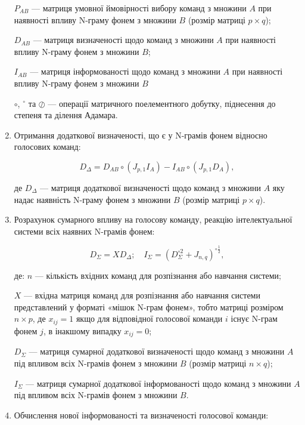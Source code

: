 \begin{enumerate}
{		$P_{AB}$ --- матриця умовної ймовірності вибору команд з множини $A$ при наявності впливу N-граму фонем з множини $B$ (розмір матриці $p\times q$); 
		
		$D_{AB}$ --- матриця визначеності щодо команд з множини $A$ при наявності впливу N-граму фонем з множини $B$; 
		
		$I_{AB}$ --- матриця інформованості щодо команд з множини $A$ при наявності впливу N-граму фонем з множини $B$
		
		$\circ$, ${}^{\circ}$ та $\oslash$ --- операції матричного поелементного добутку, піднесення до степеня та ділення Адамара.
		
	}
	
	\item Отримання додаткової визначеності, що є у N-грамів фонем відносно голосових команд:
	
	\[
	D_\Delta=D_{AB} \circ (J_{p,1}I_A)-I_{AB} \circ (J_{p,1}D_A),
	\]
	
	де $D_\Delta$ --- матриця додаткової визначеності щодо команд з множини $A$ яку надає наявність N-граму фонем з множини $B$ (розмір матриці $p\times q$).
	
	\item Розрахунок сумарного впливу на голосову команду, реакцію інтелектуальної системи всіх наявних N-грамів фонем:
	
	\[
	D_\Sigma = XD_\Delta;\quad I_\Sigma=(D_\Sigma^{\circ 2}+J_{n,q})^{\circ \frac{1}{2}},
	\]
	
	де: $n$ --- кількість вхідних команд для розпізнання або навчання системи; 
	
	{\settowidth{\leftskip}{де:\ }
		
		$X$ --- вхідна матриця команд для розпізнання або навчання системи представлений у форматі «мішок N-грам фонем», тобто матриці розміром $n \times p$, де $x_{ij}=1$ якщо для відповідної голосової команди $i$ існує N-грам фонем $j$, в інакшому випадку $x_{ij}=0$;
		
		$D_\Sigma$ --- матриця сумарної додаткової визначеності щодо команд  з множини $A$ під впливом всіх N-грамів фонем з множини $B$ (розмір матриці $n\times q$);
		
		$I_\Sigma$ --- матриця сумарної додаткової інформованості щодо команд  з множини $A$ під впливом всіх N-грамів фонем з множини $B$.
		
	}
	
	\item Обчислення нової інформованості та визначеності голосової команди:
	

\end{enumerate}
